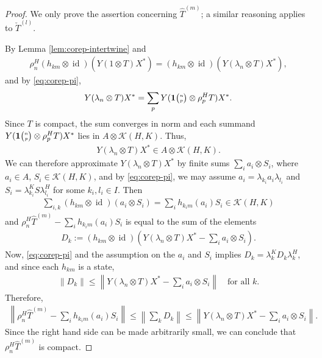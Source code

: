 \documentclass[11pt]{article}
\DeclareMathOperator{\id}{id}
\newcommand{\Grt}[3]{#1{\tiny {\begin{pmatrix} #2\\#3\end{pmatrix}}}}
\newcommand{\UnitC}[2]{\Grt{\mathbf{1}}{#1}{#2}}
\theoremstyle{definition}
\numberwithin{equation}{section}
\begin{document}
\begin{proof}
  We only prove the assertion concerning $\hat T^{(m)}$; a similar reasoning applies to $\check
  T^{(l)}$.

By Lemma \ref{lem:corep-intertwine} and
  \begin{align*}
    \rho^{H}_{n}(h_{km} \otimes \id)(Y(1\otimes T)X^{*}) = 
    (h_{km} \otimes \id)(Y(\lambda_{n} \otimes T)X^{*}),
  \end{align*}
and  by \eqref{eq:corep-pi}, 
\begin{align*}
    Y(\lambda_{n} \otimes T)X^{*} =  \sum_{p} Y(\UnitC{n}{p} \otimes \rho^{H}_{p}T)X^{*}.
  \end{align*}
  Since $T$ is compact, the sum converges in norm and each summand $Y(\UnitC{n}{p} \otimes
  \rho^{H}_{p}T)X^{*}$ lies in $A \otimes \mathcal{K}(H,K)$. Thus,
  \begin{align*}
    Y(\lambda_{n} \otimes T)X^{*} \in A \otimes \mathcal{K}(H,K).
  \end{align*}
 We can therefore approximate $Y(\lambda_{n}
  \otimes T)X^{*}$ by finite sums $\sum_{i} a_{i} \otimes S_{i}$,
  where $a_{i} \in A$, $S_{i} \in \mathcal{K}(H,K)$, and by
  \eqref{eq:corep-pi}, we may assume $a_{i}=\lambda_{k_{i}}a_{i}
  \lambda_{l_{i}}$ and $S_{i}=\lambda_{k_{i}}^{K}S\lambda_{l_{i}}^{H}$
  for some $k_{i},l_{i}\in I$. Then
  \begin{align*}
\sum_{i,k}    (h_{km} \otimes \id)(a_{i} \otimes S_{i}) = \sum_{i}
h_{k_{i}m}(a_{i})S_{i} \in \mathcal{K}(H,K)
  \end{align*}
and  $  \rho^{H}_{n}\hat T^{(m)} - \sum_{i}
h_{k_{i}m}(a_{i})S_{i}$ is equal to the sum of the elements
\begin{align*}
  D_{k}:=   (h_{km} \otimes \id)\left(Y(\lambda_{n} \otimes T)X^{*} -
    \sum_{i}a_{i} \otimes S_{i}\right).
\end{align*}
Now, \eqref{eq:corep-pi} and the assumption on the $a_{i}$ and $S_{i}$ %
implies $D_{k} = \lambda_{k}^{K}D_{k}\lambda_{k}^{H}$, and  since each $h_{km}$ is a state,
\begin{align*}
  \|D_{k}\| \leq \left\|Y(\lambda_{n} \otimes T)X^{*} -
    \sum_{i}a_{i} \otimes S_{i}\right\| \quad\text{for all } k.
\end{align*}
Therefore, 
\begin{align*}
\left\|    \rho^{H}_{n}\hat T^{(m)} - \sum_{i}
h_{k_{i}m}(a_{i})S_{i}\right\| \leq \left\|\sum_{k} D_{k}\right\| \leq \left\|Y(\lambda_{n} \otimes T)X^{*} -
    \sum_{i}a_{i} \otimes S_{i}\right\|.
\end{align*}
Since the right hand side can be made arbitrarily small, we can
conclude that $\rho^{H}_{n}\hat T^{(m)}$ is compact. 
\end{proof}
\end{document}
